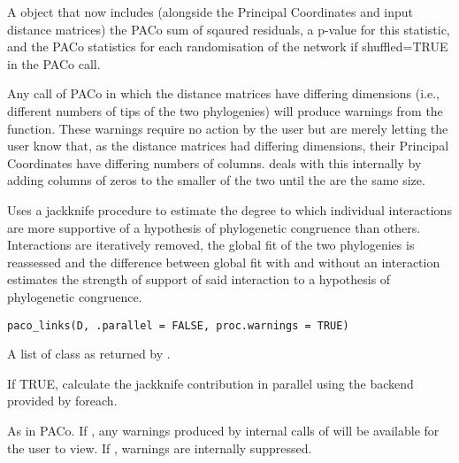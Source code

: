 \documentclass[letterpaper]{book}
\begin{document}
%
\begin{Value}
A  object that now includes (alongside the Principal Coordinates and input distance matrices) the PACo sum of sqaured residuals, a p-value for this statistic, and the PACo statistics for each randomisation of the network if shuffled=TRUE in the PACo call.
\end{Value}
%
\begin{Note}\relax
Any call of PACo in which the distance matrices have differing dimensions (i.e., different numbers of tips of the two phylogenies) will produce warnings from the  function. These warnings require no action by the user but are merely letting the user know that, as the distance matrices had differing dimensions, their Principal Coordinates have differing numbers of columns.  deals with this internally by adding columns of zeros to the smaller of the two until the are the same size.
\end{Note}
%
\begin{Examples}
\end{Examples}
%
\begin{Description}\relax
Uses a jackknife procedure to estimate the degree to which individual interactions are more supportive of a hypothesis of phylogenetic congruence than others. Interactions are iteratively removed, the global fit of the two phylogenies is reassessed and the difference between global fit with and without an interaction estimates the strength of support of said interaction to a hypothesis of phylogenetic congruence.
\end{Description}
%
\begin{Usage}
\begin{verbatim}
paco_links(D, .parallel = FALSE, proc.warnings = TRUE)
\end{verbatim}
\end{Usage}
%
\begin{Arguments}
\begin{ldescription}
\item[\code{D}] A list of class  as returned by .

\item[\code{.parallel}] If TRUE, calculate the jackknife contribution in parallel using the backend provided by foreach.

\item[\code{proc.warnings}] As in PACo. If , any warnings produced by internal calls of  will be available for the user to view. If , warnings are internally suppressed.
\end{ldescription}
\end{Arguments}
\end{document}
